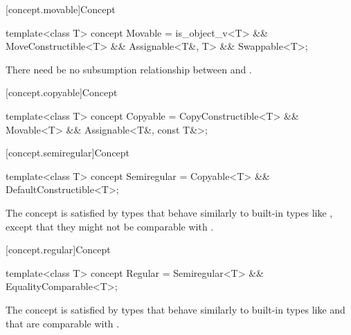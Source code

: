 [concept.movable]{Concept }

%
\begin{itemdecl}
template<class T>
concept Movable = is_object_v<T> && MoveConstructible<T> && Assignable<T&, T> && Swappable<T>;
\end{itemdecl}

\begin{itemdescr}
\pnum
There need be no subsumption relationship between
and
.
\end{itemdescr}

[concept.copyable]{Concept }

%
\begin{itemdecl}
template<class T>
concept Copyable = CopyConstructible<T> && Movable<T> && Assignable<T&, const T&>;
\end{itemdecl}

[concept.semiregular]{Concept }

%
\begin{itemdecl}
template<class T>
concept Semiregular = Copyable<T> && DefaultConstructible<T>;
\end{itemdecl}

\begin{itemdescr}
\pnum
\begin{note}
The  concept is satisfied by types that behave similarly
to built-in types like , except that they might not
be comparable with \tcode{==}.
\end{note}
\end{itemdescr}

[concept.regular]{Concept }

%
\begin{itemdecl}
template<class T>
concept Regular = Semiregular<T> && EqualityComparable<T>;
\end{itemdecl}

\begin{itemdescr}
\pnum
\begin{note}
The  concept is satisfied by types that behave similarly to
built-in types like  and that are comparable with
\tcode{==}.
\end{note}
\end{itemdescr}

